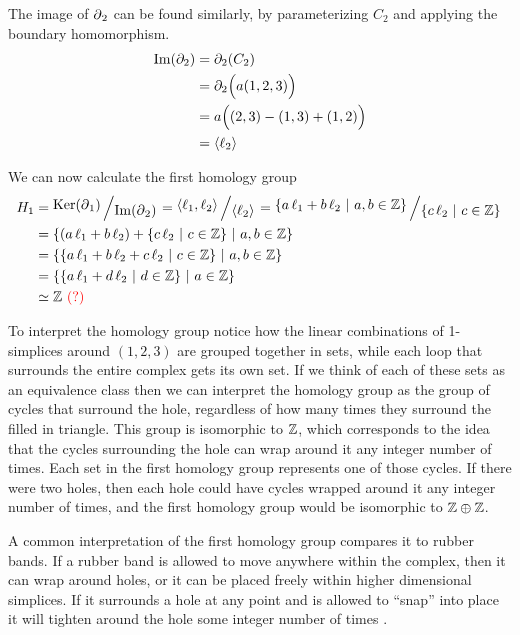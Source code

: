 \begin{example}
    The image of \(\operatorname{\partial}_2\) can be found similarly, by parameterizing \(C_2\) and applying the boundary homomorphism.
    \begin{align}
        \operatorname{Im} (\partial_2)   &= \partial_2 (C_2) \\
            &= \partial_2 \Big( a(1,2,3) \Big) \\
            &= a\Big((2,3) - (1,3) + (1,2) \Big)\\
            &= \langle \ell_2 \rangle
    \end{align}

    We can now calculate the first homology group
    \begin{align}
        H_1 &= \bigslant{\Ker(\boundary_1)}{\Ima(\boundary_{2})}
        = \bigslant{\langle \ell_1, \ell_2 \rangle}{\langle \ell_2 \rangle}
        = \bigslant{\{ a\,\ell_1 + b\,\ell_2\ |\ a,b \in \Z \}}{\{ c\,\ell_2\ |\ c \in \Z \}} \\
        &= \{ (a\,\ell_1 + b\,\ell_2) + \{ c\,\ell_2\ |\ c \in \Z \}\ |\ a,b \in \Z \} \\
        &= \{ \{ a\,\ell_1 + b\,\ell_2 + c\,\ell_2\ |\ c \in \Z \}\ |\ a,b \in \Z \} \\
        &= \{ \{ a\,\ell_1 + d\,\ell_2\ |\ d \in \Z \}\ |\ a \in \Z \} \\
        &\simeq \Z \text{ \red{(?)}}
    \end{align}

    To interpret the homology group notice how the linear combinations of 1-simplices around \((1,2,3)\) are grouped together in sets, while each loop that surrounds the entire complex gets its own set.
    If we think of each of these sets as an equivalence class then we can interpret the homology group as the group of cycles that surround the hole, regardless of how many times they surround the filled in triangle.
    This group is isomorphic to \(\mathbb{Z}\), which corresponds to the idea that the cycles surrounding the hole can wrap around it any integer number of times.
    Each set in the first homology group represents one of those cycles.
    If there were two holes, then each hole could have cycles wrapped around it any integer number of times, and the first homology group would be isomorphic to \(\mathbb{Z} \oplus \mathbb{Z}\).

    A common interpretation of the first homology group compares it to rubber bands.
    If a rubber band is allowed to move anywhere within the complex, then it can wrap around holes, or it can be placed freely within higher dimensional simplices.
    If it surrounds a hole at any point and is allowed to ``snap'' into place it will tighten around the hole some integer number of times .
\end{example}


